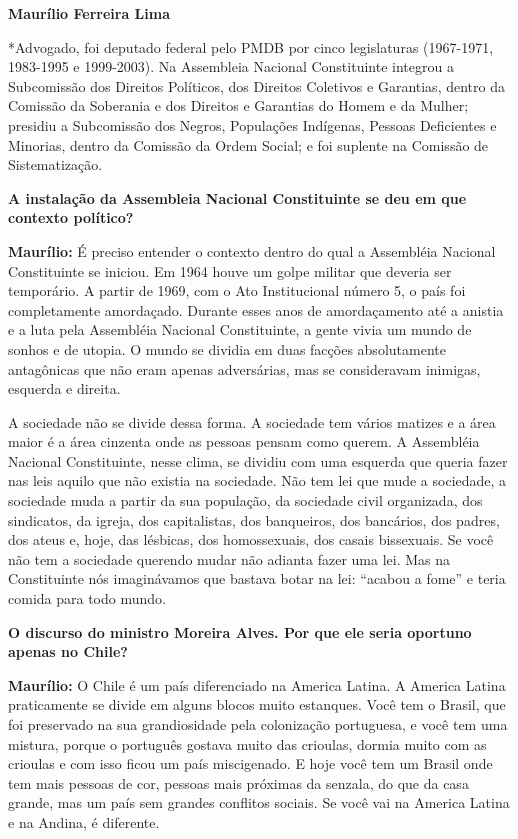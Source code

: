 \textbf{Maurílio Ferreira Lima}

*Advogado, foi deputado federal pelo PMDB por cinco legislaturas
(1967-1971, 1983-1995 e 1999-2003). Na Assembleia Nacional Constituinte
integrou a Subcomissão dos Direitos Políticos, dos Direitos Coletivos e
Garantias, dentro da Comissão da Soberania e dos Direitos e Garantias do
Homem e da Mulher; presidiu a Subcomissão dos Negros, Populações
Indígenas, Pessoas Deficientes e Minorias, dentro da Comissão da Ordem
Social; e foi suplente na Comissão de Sistematização.

\textbf{A instalação da Assembleia Nacional Constituinte se deu em que
contexto político? }

\textbf{Maurílio:} É preciso entender o contexto dentro do qual a
Assembléia Nacional Constituinte se iniciou. Em 1964 houve um golpe
militar que deveria ser temporário. A partir de 1969, com o Ato
Institucional número 5, o país foi completamente amordaçado. Durante
esses anos de amordaçamento até a anistia e a luta pela Assembléia
Nacional Constituinte, a gente vivia um mundo de sonhos e de utopia. O
mundo se dividia em duas facções absolutamente antagônicas que não eram
apenas adversárias, mas se consideravam inimigas, esquerda e direita.

A sociedade não se divide dessa forma. A sociedade tem vários matizes e
a área maior é a área cinzenta onde as pessoas pensam como querem. A
Assembléia Nacional Constituinte, nesse clima, se dividiu com uma
esquerda que queria fazer nas leis aquilo que não existia na sociedade.
Não tem lei que mude a sociedade, a sociedade muda a partir da sua
população, da sociedade civil organizada, dos sindicatos, da igreja, dos
capitalistas, dos banqueiros, dos bancários, dos padres, dos ateus e,
hoje, das lésbicas, dos homossexuais, dos casais bissexuais. Se você não
tem a sociedade querendo mudar não adianta fazer uma lei. Mas na
Constituinte nós imaginávamos que bastava botar na lei: ``acabou a
fome'' e teria comida para todo mundo.

\textbf{O discurso do ministro Moreira Alves. Por que ele seria oportuno
apenas no Chile?}

\textbf{Maurílio:} O Chile é um país diferenciado na America Latina. A
America Latina praticamente se divide em alguns blocos muito estanques.
Você tem o Brasil, que foi preservado na sua grandiosidade pela
colonização portuguesa, e você tem uma mistura, porque o português
gostava muito das crioulas, dormia muito com as crioulas e com isso
ficou um país miscigenado. E hoje você tem um Brasil onde tem mais
pessoas de cor, pessoas mais próximas da senzala, do que da casa grande,
mas um país sem grandes conflitos sociais. Se você vai na America Latina
e na Andina, é diferente.

